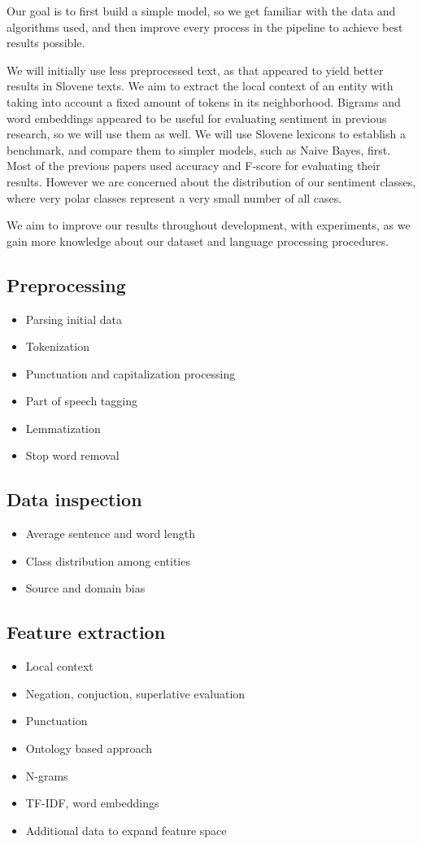 \documentclass[11pt,a4paper]{article}
\begin{document}
Our goal is to first build a simple model, so we get familiar with the data and algorithms used, and then improve every process in the pipeline to achieve best results possible.

We will initially use less preprocessed text, as that appeared to yield better results in Slovene texts. We aim to extract the local context of an entity with taking into account a fixed amount of tokens in its neighborhood. Bigrams and word embeddings appeared to be useful for evaluating sentiment in previous research, so we will use them as well. We will use Slovene lexicons to establish a benchmark, and compare them to simpler models, such as Naive Bayes, first. Most of the previous papers used accuracy and F-score for evaluating their results. However we are concerned about the distribution of our sentiment classes, where very polar classes represent a very small number of all cases. 

We aim to improve our results throughout development, with experiments, as we gain more knowledge about our dataset and language processing procedures.

\subsection{Preprocessing}
\begin{itemize}
  \item Parsing initial data
  \item Tokenization
  \item Punctuation and capitalization processing
  \item Part of speech tagging
  \item Lemmatization
  \item Stop word removal
\end{itemize}

\subsection{Data inspection}
\begin{itemize}
  \item Average sentence and word length
  \item Class distribution among entities
  \item Source and domain bias
\end{itemize}

\subsection{Feature extraction}
\begin{itemize}
  \item Local context
  \item Negation, conjuction, superlative evaluation
  \item Punctuation
  \item Ontology based approach
  \item N-grams
  \item TF-IDF, word embeddings
  \item Additional data to expand feature space
\end{itemize}
\end{document}
